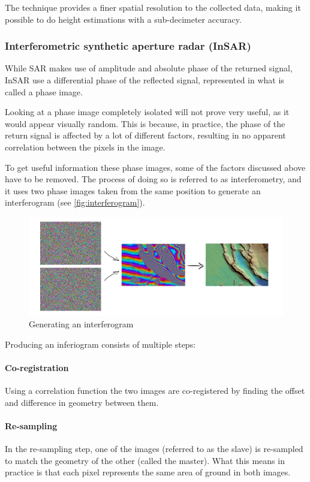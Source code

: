 The technique provides a finer spatial resolution to the collected data, making it possible to do height estimations with a sub-decimeter accuracy.

\subsubsection{Interferometric synthetic aperture radar (InSAR)}\label{section:insar}
While SAR makes use of amplitude and absolute phase of the returned signal, InSAR use a differential phase of the reflected signal, represented in what is called a phase image.

Looking at a phase image completely isolated will not prove very useful, as it would appear visually random. This is because, in practice, the phase of the return signal is affected by a lot of different factors, resulting in no apparent correlation between the pixels in the image.

To get useful information these phase images, some of the factors discussed above have to be removed. The process of doing so is referred to as interferometry, and it uses two phase images taken from the same position to generate an interferogram (see \autoref{fig:interferogram}).

\begin{figure}[!h]
	\centering
	\includegraphics[scale=0.4]{fig/inferiogram.png}
	\caption{Generating an interferogram}
	\label{fig:interferogram}
\end{figure}

Producing an inferiogram consists of multiple steps:

\paragraph{Co-registration}
Using a correlation function the two images are co-registered by finding the offset and difference in geometry between them.

\paragraph{Re-sampling}
In the re-sampling step, one of the images (referred to as the slave) is re-sampled to match the geometry of the other (called the master). What this means in practice is that each pixel represents the same area of ground in both images.

